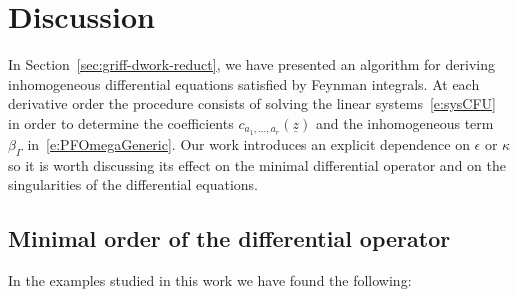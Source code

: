 \documentclass[a4paper,12pt]{article}
\numberwithin{equation}{section}
\numberwithin{figure}{section}
\begin{document}
\section{Discussion}
%
In Section~\ref{sec:griff-dwork-reduct}, we have presented an
algorithm for deriving inhomogeneous differential equations satisfied by Feynman
integrals. At each derivative order the
 procedure consists of solving the linear systems~\eqref{e:sysCFU} in order to
determine the coefficients $c_{a_1,\dots,a_r}(\underline z)$ and the 
inhomogeneous term $\beta_\Gamma$ in~\eqref{e:PFOmegaGeneric}. Our
work introduces an explicit dependence on $\epsilon$ or $\kappa$ so it is worth discussing  its effect on the minimal differential
operator and on the singularities of the differential equations.
%

\subsection{Minimal order of the differential operator}
\label{sec:minim-order-diff}

In the examples studied in this work we have found the following:
\end{document}
